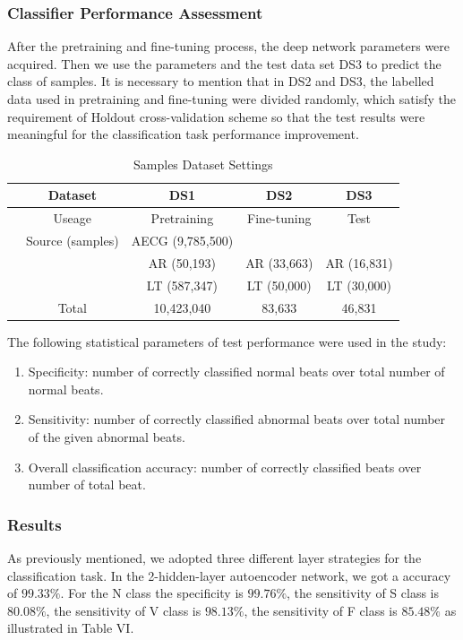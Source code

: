 \documentclass{bmcart}
\begin{document}
\subsubsection*{Classifier Performance Assessment}
After the pretraining and fine-tuning process, the deep network parameters were acquired. Then we use the parameters and the test data set DS3 to predict the class of samples. It is necessary to mention that in DS2 and DS3, the labelled data used in pretraining and fine-tuning were divided randomly, which satisfy the requirement of Holdout cross-validation scheme so that the test results were meaningful for the classification task performance improvement.

\begin{table}[!htbp]
\begin{center}
\begin{threeparttable}
\caption{Samples Dataset Settings}
\label{table3}
\begin{tabular}{ccccc}
\hline
& Dataset & DS1& DS2    &  DS3\\
\hline
& Useage  & Pretraining & Fine-tuning & Test \\
\hline
& Source (samples) & AECG (9,785,500)   &  &   \\
&  & AR (50,193)   & AR (33,663) & AR (16,831) \\
&  & LT (587,347)  & LT (50,000) & LT (30,000) \\
\hline
&Total & 10,423,040 & 83,633 & 46,831 \\
\hline
\end{tabular}
\end{threeparttable}
\end{center}
\end{table}


The following statistical parameters of test performance were used in the study:
\begin{enumerate}
\item Specificity: number of correctly classified normal beats over total number of normal beats.
\item  Sensitivity: number of correctly classified abnormal beats over total number of the given abnormal beats.
\item Overall classification accuracy: number of correctly classified beats over number of total beat.
\end{enumerate}

\subsubsection*{Results}
As previously mentioned, we adopted three different layer strategies for the classification task. In the 2-hidden-layer autoencoder network, we got a accuracy of $99.33\%$. For the N class the specificity is $99.76\%$, the sensitivity of S class is $80.08\%$, the sensitivity of V class is $98.13\%$, the sensitivity of F class is $85.48\%$ as illustrated in Table VI. 
\end{document}
